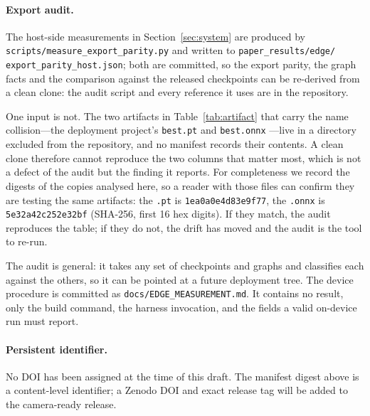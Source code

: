 \paragraph{Export audit.} The host-side measurements in Section~\ref{sec:system}
are produced by \texttt{scripts/measure\_export\_parity.py} and written to
\texttt{paper\_results/edge/}\\{\texttt{export\_parity\_host.json}}; both are
committed, so the export parity, the graph facts and the comparison against the
released checkpoints can be re-derived from a clean clone: the audit script and
every reference it uses are in the repository.

One input is not. The two artifacts in Table~\ref{tab:artifact} that carry the
name collision---the deployment project's \texttt{best.pt} and \texttt{best.onnx}%
---live in a directory excluded from the repository, and no manifest records their
contents. A clean clone therefore cannot reproduce the two columns that matter
most, which is not a defect of the audit but the finding it reports. For
completeness we record the digests of the copies analysed here, so a reader with
those files can confirm they are testing the same artifacts: the \texttt{.pt} is
\texttt{1ea0a0e4d83e9f77}, the \texttt{.onnx} is \texttt{5e32a42c252e32bf}
(SHA-256, first 16 hex digits). If they match, the audit reproduces the table; if
they do not, the drift has moved and the audit is the tool to re-run.

The audit is general: it takes any set of checkpoints and graphs and classifies
each against the others, so it can be pointed at a future deployment tree. The
device procedure is committed as \texttt{docs/EDGE\_MEASUREMENT.md}. It contains
no result, only the build command, the harness invocation, and the fields a valid
on-device run must report.

\paragraph{Persistent identifier.} No DOI has been assigned at the time of this
draft. The manifest digest above is a content-level identifier; a Zenodo DOI and
exact release tag will be added to the camera-ready release.
